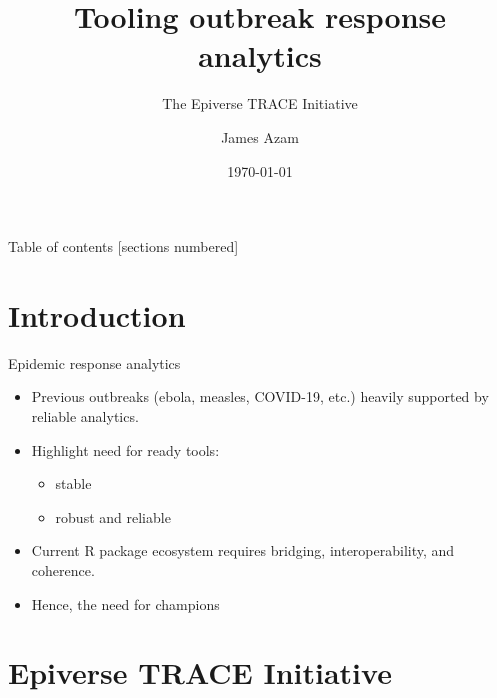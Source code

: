 \documentclass[10pt]{beamer}
\title{Tooling outbreak response analytics}
\subtitle{The Epiverse TRACE Initiative}
\date{\today}
\author{James Azam}
\institute{Epiverse Initiative, London School of Hygiene and Tropical Medicine}
\begin{document}
\begin{frame}
	\titlepage
\end{frame}


\begin{frame}{Table of contents}
  [sections numbered]
  \tableofcontents[hideallsubsections]
\end{frame}

\section{Introduction}

\begin{frame}[fragile]{Epidemic response analytics}
\begin{itemize}
\item Previous outbreaks (ebola, measles, COVID-19, etc.) heavily supported by reliable analytics. 
\item Highlight need for ready tools:
\begin{itemize}
	 \item stable
	 \item robust and reliable
\end{itemize}
\item Current R package ecosystem requires bridging, interoperability, and coherence.
\item Hence, the need for champions 
\end{itemize}
\end{frame}

\section{Epiverse TRACE Initiative}
\end{document}
